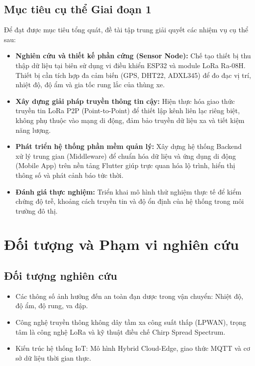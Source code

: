 \subsection{Mục tiêu cụ thể Giai đoạn 1}
Để đạt được mục tiêu tổng quát, đề tài tập trung giải quyết các nhiệm vụ cụ thể sau:
\begin{itemize}
    \item \textbf{Nghiên cứu và thiết kế phần cứng (Sensor Node):} Chế tạo thiết bị thu thập dữ liệu tại biên sử dụng vi điều khiển ESP32 và module LoRa Ra-08H. Thiết bị cần tích hợp đa cảm biến (GPS, DHT22, ADXL345) để đo đạc vị trí, nhiệt độ, độ ẩm và gia tốc rung lắc của thùng xe.
    \item \textbf{Xây dựng giải pháp truyền thông tin cậy:} Hiện thực hóa giao thức truyền tin LoRa P2P (Point-to-Point) để thiết lập kênh liên lạc riêng biệt, không phụ thuộc vào mạng di động, đảm bảo truyền dữ liệu xa và tiết kiệm năng lượng.
    \item \textbf{Phát triển hệ thống phần mềm quản lý:} Xây dựng hệ thống Backend xử lý trung gian (Middleware) để chuẩn hóa dữ liệu và ứng dụng di động (Mobile App) trên nền tảng Flutter giúp trực quan hóa lộ trình, hiển thị thông số và phát cảnh báo tức thời.
    \item \textbf{Đánh giá thực nghiệm:} Triển khai mô hình thử nghiệm thực tế để kiểm chứng độ trễ, khoảng cách truyền tin và độ ổn định của hệ thống trong môi trường đô thị.
\end{itemize}

\section{Đối tượng và Phạm vi nghiên cứu}
\subsection{Đối tượng nghiên cứu}
\begin{itemize}
    \item Các thông số ảnh hưởng đến an toàn đạn dược trong vận chuyển: Nhiệt độ, độ ẩm, độ rung, va đập.
    \item Công nghệ truyền thông không dây tầm xa công suất thấp (LPWAN), trọng tâm là công nghệ LoRa và kỹ thuật điều chế Chirp Spread Spectrum.
    \item Kiến trúc hệ thống IoT: Mô hình Hybrid Cloud-Edge, giao thức MQTT và cơ sở dữ liệu thời gian thực.
\end{itemize}

